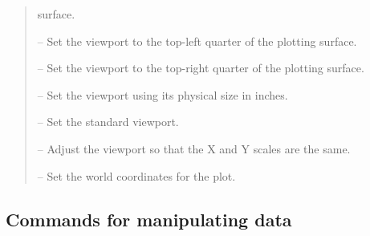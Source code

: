 \begin {quote}
\begin {description}
    surface.
  \item [\iref{VP\_TL}] -- Set the viewport to the top-left quarter of the
    plotting surface.
  \item [\iref{VP\_TR}] -- Set the viewport to the top-right quarter of the
    plotting surface.
  \item [\iref{VSIZE}] -- Set the viewport using its physical size in inches.
  \item [\iref{VSTAND}] -- Set the standard viewport.
  \item [\iref{WNAD}] -- Adjust the viewport so that the X and Y
    scales are the same.
  \item [\iref{WORLD}] -- Set the world coordinates for the plot.
  \end {description}
\end {quote}
\normalsize


\subsection{Commands for manipulating data}

